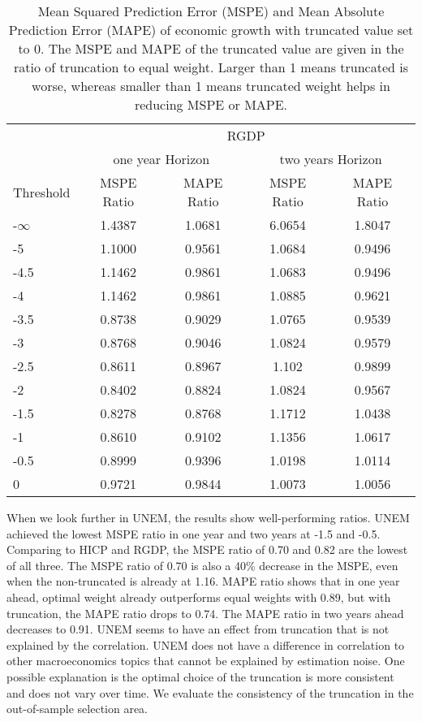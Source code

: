 \documentclass[11pt]{article}
\begin{document}
\begin{table}[!h]
	\centering
	\caption{Mean Squared Prediction Error (MSPE) and Mean Absolute Prediction Error (MAPE) of economic growth with  truncated value set to 0. The MSPE and MAPE of the truncated value are given in the ratio of truncation to equal weight. Larger than 1 means truncated is worse, whereas smaller than 1 means truncated weight helps in reducing MSPE or MAPE.}
	\label{tab: MSPE RGDP}
	\begin{tabular}{lcccc}
		\hline\hline
		& \multicolumn{4}{c}{RGDP}                                                \\
		\cmidrule(lr){2-5}
		& \multicolumn{2}{c}{one year Horizon} & \multicolumn{2}{c}{two years Horizon} \\
		\cmidrule(lr){2-3} \cmidrule(lr){4-5}
		Threshold & MSPE Ratio &    MAPE Ratio    & MSPE Ratio &    MAPE Ratio    \\ 
		\hline
		-$\infty$ & 1.4387 & 1.0681 & 6.0654 & 1.8047\\ 
		-5 & 1.1000 & 0.9561 & 1.0684 & 0.9496\\ 
		-4.5 & 1.1462 & 0.9861 & 1.0683 & 0.9496\\ 
		-4 & 1.1462 & 0.9861 & 1.0885 & 0.9621\\ 
		-3.5 & 0.8738 & 0.9029 & 1.0765 & 0.9539\\ 
		-3 & 0.8768 & 0.9046 & 1.0824 & 0.9579\\ 
		-2.5 & 0.8611 & 0.8967 & 1.102 & 0.9899\\ 
		-2 & 0.8402 & 0.8824 & 1.0824 & 0.9567\\ 
		-1.5 & 0.8278 & 0.8768 & 1.1712 & 1.0438\\ 
		-1 & 0.8610 & 0.9102 & 1.1356 & 1.0617\\ 
		-0.5 & 0.8999 & 0.9396 & 1.0198 & 1.0114\\ 
		0 & 0.9721 & 0.9844 & 1.0073 & 1.0056\\  \hline\hline
	\end{tabular}
\end{table}


When we look further in UNEM, the results show well-performing ratios. UNEM achieved the lowest MSPE ratio in one year and two years at -1.5 and -0.5. Comparing to HICP and RGDP, the MSPE ratio of 0.70 and 0.82 are the lowest of all three. The MSPE ratio of 0.70 is also a 40\% decrease in the MSPE, even when the non-truncated is already at 1.16. MAPE ratio shows that in one year ahead, optimal weight already outperforms equal weights with 0.89, but with truncation, the MAPE ratio drops to 0.74. The MAPE ratio in two years ahead decreases to 0.91. UNEM seems to have an effect from truncation that is not explained by the correlation. UNEM does not have a difference in correlation to other macroeconomics topics that cannot be explained by estimation noise. One possible explanation is the optimal choice of the truncation is more consistent and does not vary over time. We evaluate the consistency of the truncation in the out-of-sample selection area.
\end{document}
